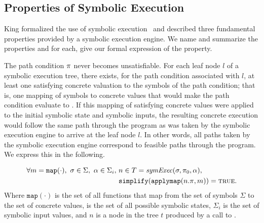 \subsection{Properties of Symbolic Execution}
King formalized the use of symbolic execution~\cite{king1976symbolic} and
described three fundamental
properties provided by a symbolic execution engine. We name and summarize the properties
and for each, give our formal expression of the property.
\setcounter{property}{0}
\renewcommand{\theproperty}{K.\arabic{property}}
\begin{property}
  \label{prop:kingsound}
  The path condition $\pi$ never becomes unsatisfiable. For each
  leaf node $l$ of a symbolic execution tree, there exists, for the path condition
  associated with $l$, at
  least one satisfying concrete valuation to the symbols of the path
  condition; that is, one mapping of symbols to concrete values that
  would make the path condition evaluate to \texttrue. If this mapping of satisfying concrete values were
  applied to the initial symbolic state and symbolic inputs, the resulting
  concrete execution would follow the same path through the program as was taken
  by the symbolic execution engine to arrive at the leaf node $l$. In other
  words, all paths taken by the symbolic execution engine correspond to feasible
  paths through the program. We express this in the following.
  

  \begin{align*}
    \forall m = \mathtt{map(\cdot)},~\sigma \in \Sigma,~\alpha \in \Sigma_i,~& n \in T = \mathit{symExec}(\sigma,\pi_0,\alpha), \\
    & \mathtt{simplify}(\mathtt{applymap}(n.\pi,m)) = \mathtt{\textsc{true}}.
  \end{align*}
  Where $\mathtt{map(\cdot)}$ is the set of all functions that map from the set
  of symbols $\Sigma$ to the set of concrete values, \symstates{} is the set of all
  possible symbolic states, $\Sigma_i$ is the set of symbolic input values, and $n$ is a node in the tree $t$ produced by a call
  to \symexecution.
\end{property}


